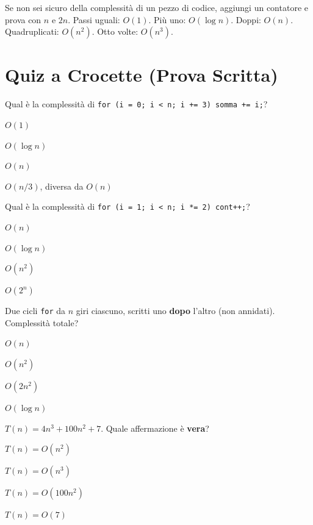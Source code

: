\begin{consiglio}
Se non sei sicuro della complessità di un pezzo di codice, aggiungi un contatore e
prova con $n$ e $2n$. Passi uguali: $O(1)$. Più uno: $O(\log n)$. Doppi: $O(n)$.
Quadruplicati: $O(n^2)$. Otto volte: $O(n^3)$.
\end{consiglio}

\section{Quiz a Crocette (Prova Scritta)}

\begin{quiz}{Qual è la complessità di \texttt{for (i = 0; i < n; i += 3) somma += i;}?}
  \item $O(1)$
  \item $O(\log n)$
  \item $O(n)$
  \item $O(n/3)$, diversa da $O(n)$
\end{quiz}

\begin{quiz}{Qual è la complessità di \texttt{for (i = 1; i < n; i *= 2) cont++;}?}
  \item $O(n)$
  \item $O(\log n)$
  \item $O(n^2)$
  \item $O(2^n)$
\end{quiz}

\begin{quiz}{Due cicli \texttt{for} da $n$ giri ciascuno, scritti uno \textbf{dopo} l'altro (non annidati). Complessità totale?}
  \item $O(n)$
  \item $O(n^2)$
  \item $O(2n^2)$
  \item $O(\log n)$
\end{quiz}

\begin{quiz}{$T(n) = 4n^3 + 100n^2 + 7$. Quale affermazione è \textbf{vera}?}
  \item $T(n) = O(n^2)$
  \item $T(n) = O(n^3)$
  \item $T(n) = O(100n^2)$
  \item $T(n) = O(7)$
\end{quiz}


